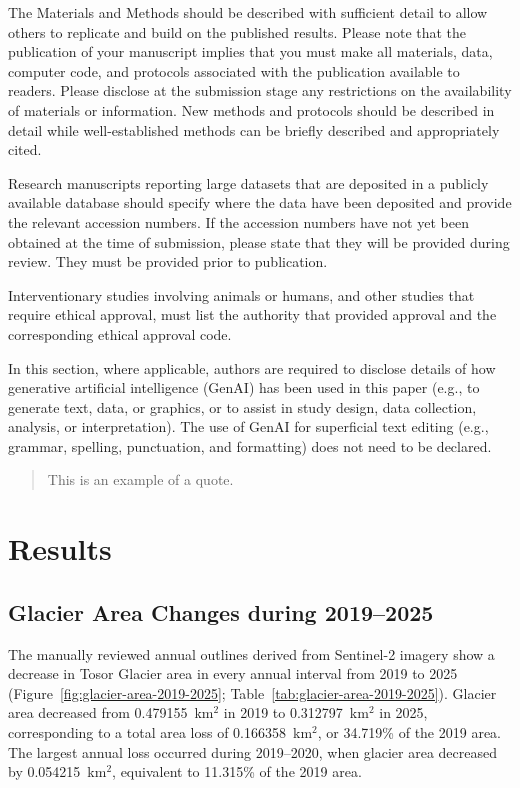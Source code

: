 \documentclass[geosciences,article,submit,moreauthors]{Definitions/mdpi}
\begin{document}
The Materials and Methods should be described with sufficient detail to allow others to replicate and build on the published results. Please note that the publication of your manuscript implies that you must make all materials, data, computer code, and protocols associated with the publication available to readers. Please disclose at the submission stage any restrictions on the availability of materials or information. New methods and protocols should be described in detail while well-established methods can be briefly described and appropriately cited.

Research manuscripts reporting large datasets that are deposited in a publicly available database should specify where the data have been deposited and provide the relevant accession numbers. If the accession numbers have not yet been obtained at the time of submission, please state that they will be provided during review. They must be provided prior to publication.

Interventionary studies involving animals or humans, and other studies that require ethical approval, must list the authority that provided approval and the corresponding ethical approval code.

In this section, where applicable, authors are required to disclose details of how generative artificial intelligence (GenAI) has been used in this paper (e.g., to generate text, data, or graphics, or to assist in study design, data collection, analysis, or interpretation). The use of GenAI for superficial text editing (e.g., grammar, spelling, punctuation, and formatting) does not need to be declared.

\begin{quote}
This is an example of a quote.
\end{quote}

\section{Results}

\subsection{Glacier Area Changes during 2019--2025}
\label{sec:glacier-area-2019-2025}

The manually reviewed annual outlines derived from Sentinel-2 imagery show a decrease in Tosor Glacier area in every annual interval from 2019 to 2025 (Figure~\ref{fig:glacier-area-2019-2025}; Table~\ref{tab:glacier-area-2019-2025}). Glacier area decreased from 0.479155~km$^{2}$ in 2019 to 0.312797~km$^{2}$ in 2025, corresponding to a total area loss of 0.166358~km$^{2}$, or 34.719\% of the 2019 area. The largest annual loss occurred during 2019--2020, when glacier area decreased by 0.054215~km$^{2}$, equivalent to 11.315\% of the 2019 area.
\end{document}
